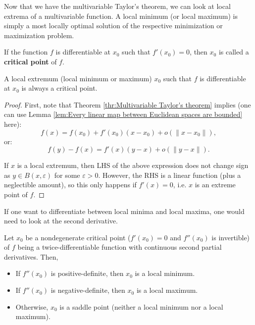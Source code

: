 Now that we have the multivariable Taylor's theorem, we can look at local
extrema of a multivariable function. A local minimum (or local maximum) is simply a most
locally optimal solution of the respective minimization or maximization problem.

\begin{theorem}
\label{thr:Critical point theorem}
  If the function \( f \) is differentiable at \( x_{0} \) such that \(
  f'(x_{0}) = 0 \), then \( x_{0} \) is called a \textbf{critical point} of \( f
  \).

  A local extremum (local minimum or maximum) \( x_{0} \) such that \( f \) is
  differentiable at \( x_{0} \) is always a critical point.
\end{theorem}

\begin{proof}
  First, note that Theorem \ref{thr:Multivariable Taylor's theorem} implies (one
  can use Lemma \ref{lem:Every linear map between Euclidean spaces are bounded}
  here):
  \[
    f(x) = f(x_{0}) + f'(x_{0})(x - x_{0}) + o(\|x - x_{0}\|)
  ,\] or:
  \[
    f(y) - f(x) = f'(x)(y - x) + o(\|y - x\|)
  .\]

  If \( x \) is a local extremum, then LHS of the above expression does not
  change sign as \( y \in B(x, \varepsilon) \) for some \( \varepsilon > 0 \).
  However, the RHS is a linear function (plus a neglectible amount), so this
  only happens if \( f'(x) = 0 \), i.e. \( x \) is an extreme point of \( f \).
\end{proof}

If one want to differentiate between local minima and local maxima, one would
need to look at the second derivative.

\begin{theorem}
\label{thr:Second derivative test}
Let \( x_{0} \) be a nondegenerate critical point (\( f'(x_{0}) = 0 \) and \(
f''(x_{0}) \) is invertible) of \( f \) being a twice-differentiable function
with continuous second partial derivatives. Then,
\begin{itemize}
\item If \( f''(x_{0}) \) is positive-definite, then \( x_{0} \) is a local
  minimum.
\item If \( f''(x_{0}) \) is negative-definite, then \( x_{0} \) is a local
  maximum.
\item Otherwise, \( x_{0} \) is a saddle point (neither a local minimum nor a
  local maximum).
\end{itemize}
\end{theorem}

